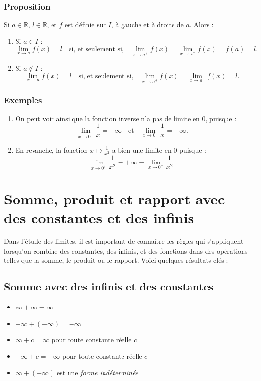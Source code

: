 \documentclass{article}
\begin{document}
	\subsubsection{Proposition}
	
	Si $a \in \mathbb{R}$, $l \in \mathbb{R}$, et $f$ est définie sur $I$, à gauche et à droite de $a$. Alors :
	
	\begin{enumerate}
		\item Si $a \in I$ : 
		\[
		\lim_{x \to a} f(x) = l \quad \text{si, et seulement si,} \quad \lim_{x \to a^+} f(x) = \lim_{x \to a^-} f(x) = f(a) = l.
		\]
		
		\item Si $a \notin I$ : 
		\[
		\lim_{x \to a} f(x) = l \quad \text{si, et seulement si,} \quad \lim_{x \to a^+} f(x) = \lim_{x \to a^-} f(x) = l.
		\]
	\end{enumerate}
	

	
	\subsubsection{Exemples}
	
	\begin{enumerate}
		\item On peut voir ainsi que la fonction inverse n’a pas de limite en 0, puisque :
		\[
		\lim_{x \to 0^+} \frac{1}{x} = +\infty \quad \text{et} \quad \lim_{x \to 0^-} \frac{1}{x} = -\infty.
		\]
		
		\item En revanche, la fonction $x \mapsto \frac{1}{x^2}$ a bien une limite en 0 puisque :
		\[
		\lim_{x \to 0^+} \frac{1}{x^2} = +\infty = \lim_{x \to 0^-} \frac{1}{x^2}.
		\]
	\end{enumerate}
	
	\section{Somme, produit et rapport avec des constantes et des infinis}
	
	Dans l'étude des limites, il est important de connaître les règles qui s'appliquent lorsqu'on combine des constantes, des infinis, et des fonctions dans des opérations telles que la somme, le produit ou le rapport. Voici quelques résultats clés :
	
	\subsection{Somme avec des infinis et des constantes}
	\begin{itemize}
		\item $\infty + \infty = \infty$
		\item $-\infty + (-\infty) = -\infty$
		\item $\infty + c = \infty$ \quad pour toute constante réelle \( c \)
		\item $-\infty + c = -\infty$ \quad pour toute constante réelle \( c \)
		\item $\infty + (-\infty)$ est une \textit{forme indéterminée}.
	\end{itemize}
	
\end{document}
